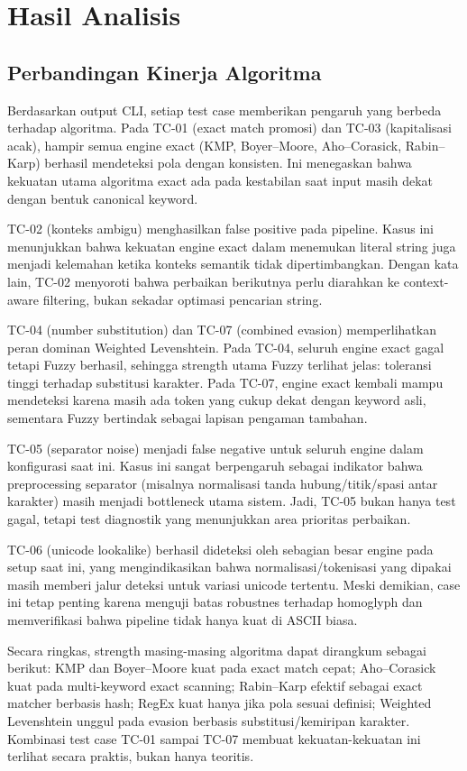 \section{Hasil Analisis}
\subsection{Perbandingan Kinerja Algoritma}
Berdasarkan output CLI, setiap test case memberikan pengaruh yang berbeda terhadap algoritma. Pada TC-01 (exact match promosi) dan TC-03 (kapitalisasi acak), hampir semua engine exact (KMP, Boyer--Moore, Aho--Corasick, Rabin--Karp) berhasil mendeteksi pola dengan konsisten. Ini menegaskan bahwa kekuatan utama algoritma exact ada pada kestabilan saat input masih dekat dengan bentuk canonical keyword.

TC-02 (konteks ambigu) menghasilkan false positive pada pipeline. Kasus ini menunjukkan bahwa kekuatan engine exact dalam menemukan literal string juga menjadi kelemahan ketika konteks semantik tidak dipertimbangkan. Dengan kata lain, TC-02 menyoroti bahwa perbaikan berikutnya perlu diarahkan ke context-aware filtering, bukan sekadar optimasi pencarian string.

TC-04 (number substitution) dan TC-07 (combined evasion) memperlihatkan peran dominan Weighted Levenshtein. Pada TC-04, seluruh engine exact gagal tetapi Fuzzy berhasil, sehingga strength utama Fuzzy terlihat jelas: toleransi tinggi terhadap substitusi karakter. Pada TC-07, engine exact kembali mampu mendeteksi karena masih ada token yang cukup dekat dengan keyword asli, sementara Fuzzy bertindak sebagai lapisan pengaman tambahan.

TC-05 (separator noise) menjadi false negative untuk seluruh engine dalam konfigurasi saat ini. Kasus ini sangat berpengaruh sebagai indikator bahwa preprocessing separator (misalnya normalisasi tanda hubung/titik/spasi antar karakter) masih menjadi bottleneck utama sistem. Jadi, TC-05 bukan hanya test gagal, tetapi test diagnostik yang menunjukkan area prioritas perbaikan.

TC-06 (unicode lookalike) berhasil dideteksi oleh sebagian besar engine pada setup saat ini, yang mengindikasikan bahwa normalisasi/tokenisasi yang dipakai masih memberi jalur deteksi untuk variasi unicode tertentu. Meski demikian, case ini tetap penting karena menguji batas robustnes terhadap homoglyph dan memverifikasi bahwa pipeline tidak hanya kuat di ASCII biasa.

Secara ringkas, strength masing-masing algoritma dapat dirangkum sebagai berikut: KMP dan Boyer--Moore kuat pada exact match cepat; Aho--Corasick kuat pada multi-keyword exact scanning; Rabin--Karp efektif sebagai exact matcher berbasis hash; RegEx kuat hanya jika pola sesuai definisi; Weighted Levenshtein unggul pada evasion berbasis substitusi/kemiripan karakter. Kombinasi test case TC-01 sampai TC-07 membuat kekuatan-kekuatan ini terlihat secara praktis, bukan hanya teoritis.

